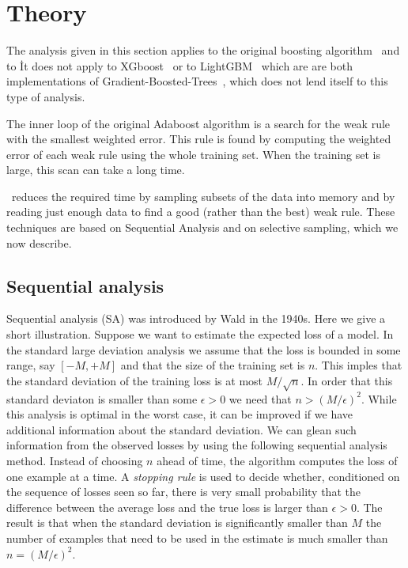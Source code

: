 \section{Theory}
The analysis given in this section applies to the original boosting
algorithm~\cite{orig, confidence-rated, adtrees} and to \Sparrow\. It
does not apply to XGboost~\cite{} or to LightGBM~\cite{} which are are
both implementations of Gradient-Boosted-Trees~\cite{}, which does not
lend itself to this type of analysis.

The inner loop of the original Adaboost algorithm is a search for the
weak rule with the smallest weighted error. This rule is found by
computing the weighted error of each weak rule using the whole
training set. When the training set is large, this scan can take a
long time.

\Sparrow\ reduces the required time by sampling subsets of the data into
memory and by reading just enough data to find a good (rather than the
best) weak rule. These techniques are based on Sequential Analysis and
on selective sampling, which we now describe.

\subsection*{Sequential analysis}
Sequential analysis (SA) was introduced by
Wald\cite{wald_sequential_1973} in the 1940s.  Here we give a short
illustration. Suppose we want to estimate the expected loss of a
model. In the standard large deviation analysis we assume that the
loss is bounded in some range, say $[-M,+M]$ and that the size of the
training set is $n$. This imples that the standard deviation of the
training loss is at most $M/\sqrt{n}$. In order that this standard
deviaton is smaller than some $\epsilon>0$ we need that
$n > (M/\epsilon)^2$. While this analysis is optimal in the worst case, it
can be improved if we have additional information about the standard
deviation. We can glean such information from the observed losses by
using the following sequential analysis method. Instead of choosing
$n$ ahead of time, the algorithm computes the loss of one example at a
time. A {\em stopping rule} is used to decide whether, conditioned on
the sequence of losses seen so far, there is very small probability
that the difference between the average loss and the true loss is
larger than $\epsilon>0$. The result is that when the standard
deviation is significantly smaller than $M$ the number of examples
that need to be used in the estimate is much smaller than
$n=(M/\epsilon)^2$.

